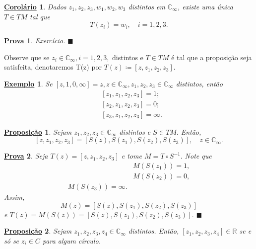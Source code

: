 \documentclass{article}
\newtheorem{example}{\underline{Exemplo}}[section]
\newtheorem*{proof*}{\underline{Prova}}
\newtheorem*{prop*}{\underline{Proposi\c c\~ao}}
\newtheorem*{crl*}{\underline{Corol\'ario}}
\renewcommand\qedsymbol{$\blacksquare$}
\begin{document}
  \begin{crl*}
    Dados $z_1, z_2, z_3, w_1, w_2, w_3$ distintos em $\mathbb{C}_{\infty}$, existe uma \'unica $T\in{TM}$ tal que
    $$
    T(z_{i}) = w_{i}, \quad i=1, 2, 3.
    $$
  \end{crl*}
  \begin{proof*}
    Exerc\'icio. \qedsymbol
  \end{proof*}
  Observe que se $z_{i}\in \mathbb{C}_{\infty}, i = 1, 2, 3,$ distintos e $T\in{TM}$ \'e tal que a proposi\c c\~ao
  seja satisfeita, denotaremos T(z) por  $T(z) \coloneqq  [z, z_1, z_2, z_3].$
  \begin{example}
    Se $[z, 1, 0, \infty] = z, z\in \mathbb{C}_{\infty}, z_1, z_2, z_3\in \mathbb{C}_{\infty}$ distintos, ent\~ao
    \begin{align*}
  &[z_1, z_1, z_2, z_3] = 1; \\
  &[z_2, z_1, z_2, z_3] = 0; \\
  &[z_3, z_1, z_2, z_3] = \infty.
    \end{align*}
  \end{example}
  \begin{prop*}
    Sejam $z_1, z_2, z_3\in \mathbb{C}_{\infty}$ distintos e $S\in{TM}.$ Ent\~ao, 
    $$
    [z, z_1, z_2, z_3] = [S(z), S(z_1), S(z_2), S(z_3)], \quad z\in \mathbb{C}_{\infty}.
    $$
  \end{prop*}
  \begin{proof*}
    Seja $T(z) = [z, z_1, z_2, z_3]$ e tome $M = T\circ{S^{-1}}.$ Note que 
    \begin{align*}
 &M(S(z_1)) = 1, \\
 &M(S(z_2)) = 0, \\
 M(S(z_3)) = \infty.
    \end{align*} 
    Assim, 
    $$
    M(z) = [S(z), S(z_1), S(z_2), S(z_3)]
    $$
    e $T(z) = M(S(z)) = [S(z), S(z_1), S(z_2), S(z_3)]$. \qedsymbol
  \end{proof*}
  \begin{prop*}
    Sejam $z_1, z_2, z_3, z_4\in \mathbb{C}_{\infty}$ distintos. Ent\~ao, $[z_1, z_2, z_3, z_4]\in \mathbb{R}$ se e s\'o se 
    $z_{i}\in{C}$ para algum c\'irculo.
  \end{prop*}
\end{document}
